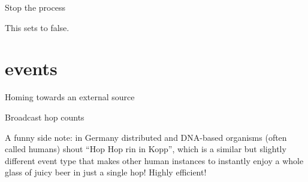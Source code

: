 \documentclass[letterpaper,10pt,english]{sphinxmanual}
\begin{document}
\begin{fulllineitems}
\begin{fulllineitems}
\end{fulllineitems}


\begin{fulllineitems}
\label{\detokenize{index:observer.Observer.stop}}
Stop the process

This sets  to false.

\end{fulllineitems}


\end{fulllineitems}



\chapter{events}
\label{\detokenize{index:module-events}}\label{\detokenize{index:events}}

\begin{fulllineitems}
\label{\detokenize{index:events.Homing}}
Homing towards an external source

\end{fulllineitems}


\begin{fulllineitems}
\label{\detokenize{index:events.HopCount}}
Broadcast hop counts

A funny side note: in Germany distributed and DNA-based organisms (often
called humans) shout “Hop Hop rin in Kopp”, which is a similar but slightly
different event type that makes other human instances to instantly enjoy
a whole glass of juicy beer in just a single hop! Highly efficient!

\end{fulllineitems}

\end{document}
